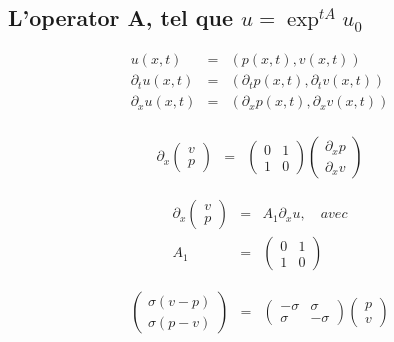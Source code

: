 \documentclass[a4paper,11pt]{article}
\begin{document}
\subsection*{L'operator A, tel que \( u = \exp^{tA}u_{0} \)}

\begin{equation*}
\begin{array}{rcl}
    u(x,t) &=& (p(x,t), v(x,t)) \\
    \partial_{t}u(x,t) &=& (\partial_{t}p(x,t),  \partial_{t}v(x,t)) \\
    \partial_{x}u(x,t) &=& (\partial_{x}p(x,t),  \partial_{x}v(x,t)) \\
\end{array}
\end{equation*}

\begin{equation*}
\begin{array}{rcl}
    \partial_{x}
    \begin{pmatrix}
        v \\
        p
    \end{pmatrix} &=&
    \begin{pmatrix}
        0 & 1 \\
        1 & 0
    \end{pmatrix}
    \begin{pmatrix}
        \partial_{x}p \\
        \partial_{x}v
    \end{pmatrix}
\end{array}
\end{equation*}

\begin{equation*}
\begin{array}{rcl}
    \partial_{x}
    \begin{pmatrix}
        v \\
        p
    \end{pmatrix} &=&
    A_{1}\partial_{x}u, \quad avec \\
    A_{1} &=&
        \begin{pmatrix}
            0 & 1 \\
            1 & 0
        \end{pmatrix}
\end{array}
\end{equation*}

\begin{equation*}
\begin{array}{rcl}
    \begin{pmatrix}
        \sigma(v-p) \\
        \sigma(p-v)
    \end{pmatrix} &=&
    \begin{pmatrix}
        -\sigma & \sigma \\
        \sigma & -\sigma
    \end{pmatrix}
    \begin{pmatrix}
        p \\
        v
    \end{pmatrix}
\end{array}
\end{equation*}
\end{document}
